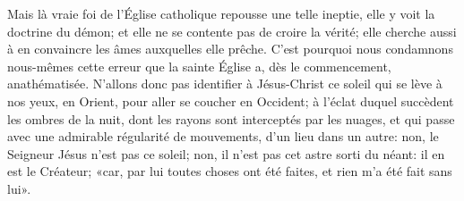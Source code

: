 Mais là vraie foi de l’Église catholique repousse une telle ineptie,
	elle y voit la doctrine du démon;
	et elle ne se contente pas de croire la vérité;
	elle cherche aussi à en convaincre les âmes auxquelles elle prêche.
C’est pourquoi nous condamnons nous-mêmes cette erreur
	que la sainte Église a, dès le commencement, anathématisée.
N’allons donc pas identifier à Jésus-Christ ce soleil
	qui se lève à nos yeux, en Orient, pour aller se coucher en Occident;
	à l’éclat duquel succèdent les ombres de la nuit,
	dont les rayons sont interceptés par les nuages,
	et qui passe avec une admirable régularité de mouvements,
		d’un lieu dans un autre:
	non, le Seigneur Jésus n’est pas ce soleil;
	non, il n’est pas cet astre sorti du néant:
	il en est le Créateur;
	«car, par lui toutes choses ont été faites, et rien m’a été fait sans lui».

